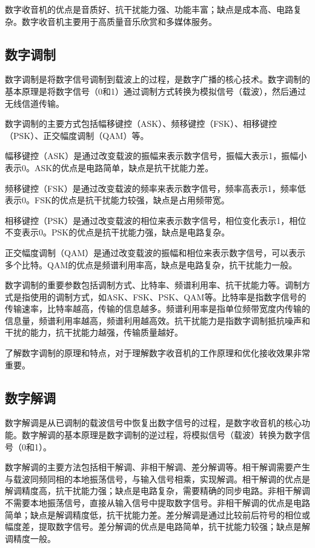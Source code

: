 \documentclass[12pt,UTF8]{ctexbook}
\begin{document}
数字收音机的优点是音质好、抗干扰能力强、功能丰富；缺点是成本高、电路复杂。数字收音机主要用于高质量音乐欣赏和多媒体服务。

\subsection{数字调制}

数字调制是将数字信号调制到载波上的过程，是数字广播的核心技术。数字调制的基本原理是将数字信号（0和1）通过调制方式转换为模拟信号（载波），然后通过无线信道传输。

数字调制的主要方式包括幅移键控（ASK）、频移键控（FSK）、相移键控（PSK）、正交幅度调制（QAM）等。

幅移键控（ASK）是通过改变载波的振幅来表示数字信号，振幅大表示1，振幅小表示0。ASK的优点是电路简单，缺点是抗干扰能力差。

频移键控（FSK）是通过改变载波的频率来表示数字信号，频率高表示1，频率低表示0。FSK的优点是抗干扰能力较强，缺点是占用频带宽。

相移键控（PSK）是通过改变载波的相位来表示数字信号，相位变化表示1，相位不变表示0。PSK的优点是抗干扰能力强，缺点是电路复杂。

正交幅度调制（QAM）是通过改变载波的振幅和相位来表示数字信号，可以表示多个比特。QAM的优点是频谱利用率高，缺点是电路复杂，抗干扰能力一般。

数字调制的重要参数包括调制方式、比特率、频谱利用率、抗干扰能力等。调制方式是指使用的调制方式，如ASK、FSK、PSK、QAM等。比特率是指数字信号的传输速率，比特率越高，传输的信息越多。频谱利用率是指单位频带宽度内传输的信息量，频谱利用率越高，频谱利用越高效。抗干扰能力是指数字调制抵抗噪声和干扰的能力，抗干扰能力越强，传输质量越好。

了解数字调制的原理和特点，对于理解数字收音机的工作原理和优化接收效果非常重要。

\subsection{数字解调}

数字解调是从已调制的载波信号中恢复出数字信号的过程，是数字收音机的核心功能。数字解调的基本原理是数字调制的逆过程，将模拟信号（载波）转换为数字信号（0和1）。

数字解调的主要方法包括相干解调、非相干解调、差分解调等。相干解调需要产生与载波同频同相的本地振荡信号，与输入信号相乘，实现解调。相干解调的优点是解调精度高，抗干扰能力强；缺点是电路复杂，需要精确的同步电路。非相干解调不需要本地振荡信号，直接从输入信号中提取数字信号。非相干解调的优点是电路简单；缺点是解调精度低，抗干扰能力差。差分解调是通过比较前后符号的相位或幅度差，提取数字信号。差分解调的优点是电路简单，抗干扰能力较强；缺点是解调精度一般。
\end{document}
